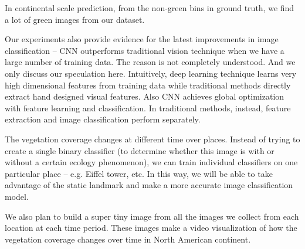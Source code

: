 
In continental scale prediction, from the non-green bins in ground truth, we find a lot of 
green images from our dataset.


Our experiments also provide evidence for the latest improvements in image classification -- CNN outperforms traditional vision technique when
 we have a large number of training data. The reason is not completely understood. And we only 
discuss our speculation here.
Intuitively, deep learning technique learns very high dimensional features from training data
while traditional methods directly extract hand designed visual features. Also CNN achieves 
global optimization with feature
learning and classification. In traditional methods, instead, feature extraction and image
classification perform separately.




The vegetation coverage changes at different time over places. 
Instead of trying to create a single binary classifier (to determine whether this image is with or
without a certain ecology phenomenon),
we can train individual classifiers on one particular place 
-- e.g. Eiffel tower, etc. 
In this way, we will be able to 
take advantage of the static landmark and make a more accurate image classification model.


We also plan to build a super tiny image from all the images we collect from each location at each time period. 
These images make a video visualization of how the vegetation coverage changes over time in North American continent.

